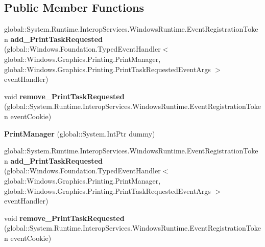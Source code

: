 \subsection*{Public Member Functions}
\begin{DoxyCompactItemize}
\item 
\mbox{\label{class_windows_1_1_graphics_1_1_printing_1_1_print_manager_ad4f9319fbeb60847591b14fbe244a321}} 
global\+::\+System.\+Runtime.\+Interop\+Services.\+Windows\+Runtime.\+Event\+Registration\+Token {\bfseries add\+\_\+\+Print\+Task\+Requested} (global\+::\+Windows.\+Foundation.\+Typed\+Event\+Handler$<$ global\+::\+Windows.\+Graphics.\+Printing.\+Print\+Manager, global\+::\+Windows.\+Graphics.\+Printing.\+Print\+Task\+Requested\+Event\+Args $>$ event\+Handler)
\item 
\mbox{\label{class_windows_1_1_graphics_1_1_printing_1_1_print_manager_af794d7bfcf46b47b3e0cfaf0e7d3e154}} 
void {\bfseries remove\+\_\+\+Print\+Task\+Requested} (global\+::\+System.\+Runtime.\+Interop\+Services.\+Windows\+Runtime.\+Event\+Registration\+Token event\+Cookie)
\item 
\mbox{\label{class_windows_1_1_graphics_1_1_printing_1_1_print_manager_ac3534eb55e14156385c81406eb48acd4}} 
{\bfseries Print\+Manager} (global\+::\+System.\+Int\+Ptr dummy)
\item 
\mbox{\label{class_windows_1_1_graphics_1_1_printing_1_1_print_manager_ad4f9319fbeb60847591b14fbe244a321}} 
global\+::\+System.\+Runtime.\+Interop\+Services.\+Windows\+Runtime.\+Event\+Registration\+Token {\bfseries add\+\_\+\+Print\+Task\+Requested} (global\+::\+Windows.\+Foundation.\+Typed\+Event\+Handler$<$ global\+::\+Windows.\+Graphics.\+Printing.\+Print\+Manager, global\+::\+Windows.\+Graphics.\+Printing.\+Print\+Task\+Requested\+Event\+Args $>$ event\+Handler)
\item 
\mbox{\label{class_windows_1_1_graphics_1_1_printing_1_1_print_manager_af794d7bfcf46b47b3e0cfaf0e7d3e154}} 
void {\bfseries remove\+\_\+\+Print\+Task\+Requested} (global\+::\+System.\+Runtime.\+Interop\+Services.\+Windows\+Runtime.\+Event\+Registration\+Token event\+Cookie)

\end{DoxyCompactItemize}

